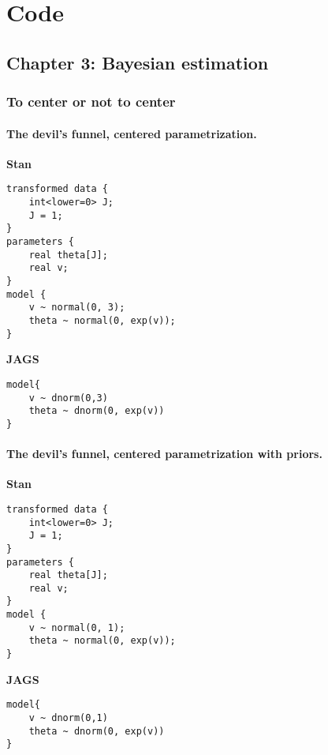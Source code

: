 \chapter{Code} \label{appC:additional}


\section{Chapter 3: Bayesian estimation} \label{appC1:chapter3}

\subsection{To center or not to center} \label{appC1_1:noncenter}

\subsubsection{The devil's funnel, centered parametrization.} 

\noindent \textbf{Stan}
%
\begin{lstlisting}
transformed data {
	int<lower=0> J;
	J = 1;
}
parameters {
	real theta[J];
	real v;
}
model {
	v ~ normal(0, 3);
	theta ~ normal(0, exp(v));
}
\end{lstlisting}


\noindent \textbf{JAGS}
%
\begin{lstlisting}
model{
	v ~ dnorm(0,3)
	theta ~ dnorm(0, exp(v))
}
\end{lstlisting}




\subsubsection{The devil's funnel, centered parametrization with priors.} 

\noindent \textbf{Stan}
%
\begin{lstlisting}
transformed data {
	int<lower=0> J;
	J = 1;
}
parameters {
	real theta[J];
	real v;
}
model {
	v ~ normal(0, 1);
	theta ~ normal(0, exp(v));
}
\end{lstlisting}


\noindent \textbf{JAGS}
%
\begin{lstlisting}
model{
	v ~ dnorm(0,1)
	theta ~ dnorm(0, exp(v))
}
\end{lstlisting}


